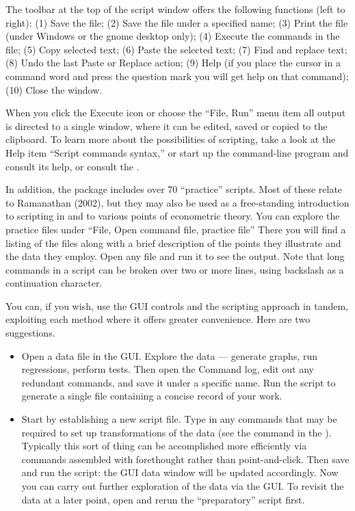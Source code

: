 The toolbar at the top of the script window offers the following
functions (left to right): (1) Save the file; (2) Save the file under
a specified name; (3) Print the file (under Windows or the gnome
desktop only); (4) Execute the commands in the file; (5) Copy selected
text; (6) Paste the selected text; (7) Find and replace text; (8) Undo
the last Paste or Replace action; (9) Help (if you place the cursor in
a command word and press the question mark you will get help on that
command); (10) Close the window.  

When you click the Execute icon or choose the ``File, Run'' menu item
all output is directed to a single window, where it can be edited,
saved or copied to the clipboard.  To learn more about the
possibilities of scripting, take a look at the  Help item
``Script commands syntax,'' or start up the command-line program
 and consult its help, or consult the \GCR.

In addition, the  package includes over 70 ``practice''
scripts.  Most of these relate to Ramanathan (2002), but they may also
be used as a free-standing introduction to scripting in 
and to various points of econometric theory.  You can explore the
practice files under ``File, Open command file, practice file'' There
you will find a listing of the files along with a brief description of
the points they illustrate and the data they employ.  Open any file
and run it to see the output.  Note that long commands in a script can
be broken over two or more lines, using backslash as a continuation
character.

You can, if you wish, use the GUI controls and the scripting approach
in tandem, exploiting each method where it offers greater convenience.
Here are two suggestions.

\begin{itemize}
\item Open a data file in the GUI.  Explore the data --- generate
  graphs, run regressions, perform tests.  Then open the Command log,
  edit out any redundant commands, and save it under a specific name.
  Run the script to generate a single file containing a concise record
  of your work.
\item Start by establishing a new script file.  Type in any commands
  that may be required to set up transformations of the data (see the
   command in the \GCR). Typically this sort of thing can be
  accomplished more efficiently via commands assembled with
  forethought rather than point-and-click. Then save and run the
  script: the GUI data window will be updated accordingly.  Now you
  can carry out further exploration of the data via the GUI.  To
  revisit the data at a later point, open and rerun the
  ``preparatory'' script first.
\end{itemize}



